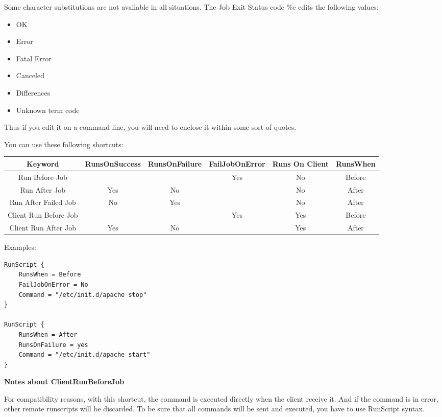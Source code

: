\begin{description}
Some character substitutions are not available in all situations. The Job Exit
Status code \%e edits the following values:

\begin{itemize}
\item OK
\item Error
\item Fatal Error
\item Canceled
\item Differences
\item Unknown term code
\end{itemize}

   Thus if you edit it on a command line, you will need to enclose
   it within some sort of quotes.


You can use these following shortcuts:\\

\begin{tabular}{|c|c|c|c|c|c}
\hline
Keyword & RunsOnSuccess & RunsOnFailure  & FailJobOnError & Runs On Client & RunsWhen  \\
\hline
\hline
Run Before Job         &        &       & Yes     & No     & Before \\
\hline
Run After Job          &  Yes   &   No  &         & No     & After  \\
\hline
Run After Failed Job   &  No    &  Yes  &         & No     & After  \\
\hline
Client Run Before Job  &        &       & Yes     & Yes    & Before \\
\hline
Client Run After Job   &  Yes   &   No  &         & Yes    & After  \\
\hline
\end{tabular}

Examples:
\begin{verbatim}
RunScript {
    RunsWhen = Before
    FailJobOnError = No
    Command = "/etc/init.d/apache stop"
}

RunScript {
    RunsWhen = After
    RunsOnFailure = yes
    Command = "/etc/init.d/apache start"
}
\end{verbatim}

{\bf Notes about ClientRunBeforeJob}

For compatibility reasons, with this shortcut, the command is executed
directly when the client receive it. And if the command is in error, other
remote runscripts will be discarded. To be sure that all commands will be
sent and executed, you have to use RunScript syntax.


\end{description}
